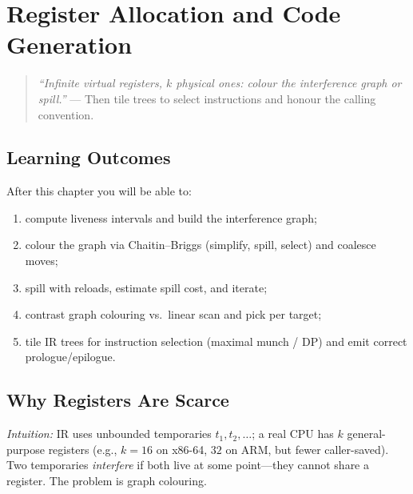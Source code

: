 \chapter{Register Allocation and Code Generation}
\label{ch:regalloc}

\begin{quote}
\emph{``Infinite virtual registers, $k$ physical ones: colour the interference graph or spill.''} --- Then tile trees to select instructions and honour the calling convention.
\end{quote}

\noindent{}
\vspace{0.4em}

\section*{Learning Outcomes}
After this chapter you will be able to:
\begin{enumerate}[label=(L\arabic*)]
    \item compute liveness intervals and build the interference graph;
    \item colour the graph via Chaitin--Briggs (simplify, spill, select) and coalesce moves;
    \item spill with reloads, estimate spill cost, and iterate;
    \item contrast graph colouring vs.\ linear scan and pick per target;
    \item tile IR trees for instruction selection (maximal munch / DP) and emit correct prologue/epilogue.
\end{enumerate}

\section{Why Registers Are Scarce}
\label{sec:why-regs}
\emph{Intuition:} IR uses unbounded temporaries $t_1,t_2,\dots$; a real CPU has $k$ general-purpose registers (e.g., $k=16$ on x86-64, $32$ on ARM, but fewer caller-saved). Two temporaries \emph{interfere} if both live at some point---they cannot share a register. The problem is graph colouring.

